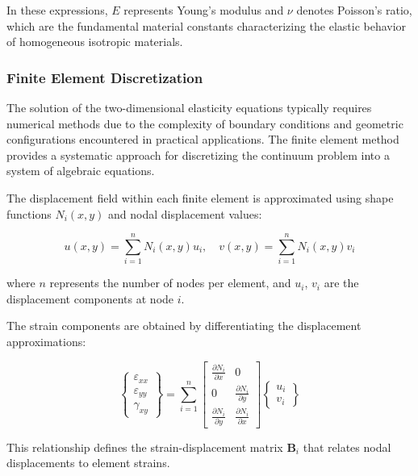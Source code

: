 \documentclass[12pt,a4paper]{report}
\begin{document}
In these expressions, $E$ represents Young's modulus and $\nu$ denotes Poisson's ratio, which are the fundamental material constants characterizing the elastic behavior of homogeneous isotropic materials.

\subsubsection{Finite Element Discretization}

The solution of the two-dimensional elasticity equations typically requires numerical methods due to the complexity of boundary conditions and geometric configurations encountered in practical applications. The finite element method provides a systematic approach for discretizing the continuum problem into a system of algebraic equations.

The displacement field within each finite element is approximated using shape functions $N_i(x,y)$ and nodal displacement values:

\begin{equation}
u(x,y) = \sum_{i=1}^{n} N_i(x,y) u_i, \quad
v(x,y) = \sum_{i=1}^{n} N_i(x,y) v_i
\end{equation}

where $n$ represents the number of nodes per element, and $u_i$, $v_i$ are the displacement components at node $i$.

The strain components are obtained by differentiating the displacement approximations:

\begin{equation}
\begin{Bmatrix} 
\varepsilon_{xx} \\ 
\varepsilon_{yy} \\ 
\gamma_{xy} 
\end{Bmatrix} 
= \sum_{i=1}^{n} 
\begin{bmatrix} 
\frac{\partial N_i}{\partial x} & 0 \\ 
0 & \frac{\partial N_i}{\partial y} \\ 
\frac{\partial N_i}{\partial y} & \frac{\partial N_i}{\partial x} 
\end{bmatrix} 
\begin{Bmatrix} 
u_i \\ 
v_i 
\end{Bmatrix}
\end{equation}

This relationship defines the strain-displacement matrix $\mathbf{B}_i$ that relates nodal displacements to element strains.
\end{document}
